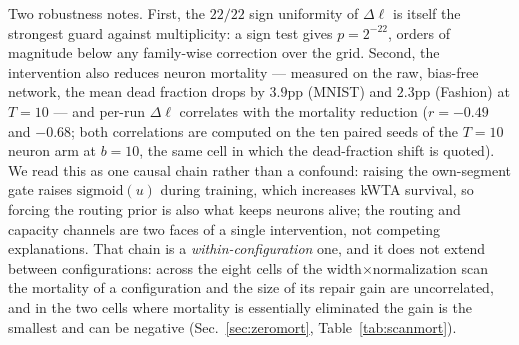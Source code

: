 \documentclass[review,12pt,number]{elsarticle}
\begin{document}
Two robustness notes. First, the $22/22$ sign uniformity of $\Delta\ell$
is itself the strongest guard against multiplicity: a sign test gives
$p = 2^{-22}$, orders of magnitude below any family-wise correction over
the grid. Second, the intervention also reduces neuron mortality ---
measured on the raw, bias-free network, the mean dead fraction drops by
$3.9$pp (MNIST) and $2.3$pp (Fashion) at $T{=}10$ --- and per-run
$\Delta\ell$ correlates with the mortality reduction ($r{=}-0.49$ and
$-0.68$; both correlations are computed on the ten paired seeds of the
$T{=}10$ neuron arm at $b{=}10$, the same cell in which the dead-fraction
shift is quoted). We read this as one causal chain rather than a confound:
raising the own-segment gate raises $\mathrm{sigmoid}(u)$ during
training, which increases kWTA survival, so forcing the routing prior is
also what keeps neurons alive; the routing and capacity channels are two
faces of a single intervention, not competing explanations. That chain is
a \emph{within-configuration} one, and it does not extend between
configurations: across the eight cells of the width$\times$normalization
scan the mortality of a configuration and the size of its repair gain are
uncorrelated, and in the two cells where mortality is essentially
eliminated the gain is the smallest and can be negative
(Sec.~\ref{sec:zeromort}, Table~\ref{tab:scanmort}).
\end{document}
